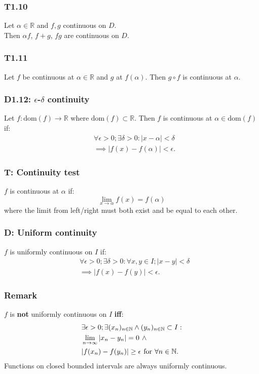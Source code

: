 \documentclass{article}
\begin{document}
\begin{multicols*}{3}
\subsubsection*{T1.10}
Let $\alpha\in\mathbb{R}$ and $f,g$ continuous on $D$. \\
Then $\alpha f$, $f+g$, $fg$ are continuous on $D$.

\subsubsection*{T1.11}
Let $f$ be continuous at $\alpha\in\mathbb{R}$
and $g$ at $f(\alpha)$.
Then $g\circ f$ is continuous at $\alpha$.

\subsubsection*{D1.12: $\epsilon$-$\delta$ continuity}
Let $f:\text{dom}(f)\rightarrow\mathbb{R}$
where $\text{dom}(f)\subset\mathbb{R}$.
Then $f$ is continuous at $\alpha\in\text{dom}(f)$ if:
\begin{align*}
    &\forall\epsilon>0;\exists\delta>0:
    |x-\alpha|<\delta \\
    &\implies
    |f(x)-f(\alpha)|<\epsilon.
\end{align*}

\subsubsection*{T: Continuity test}
$f$ is continuous at $\alpha$ if:
$$\lim_{x\rightarrow\alpha}f(x)=f(\alpha)$$
where the limit from left/right must both exist
and be equal to each other.

\subsubsection*{D: Uniform continuity}
$f$ is uniformly continuous on $I$ if:
\begin{align*}
    &\forall\epsilon>0;\exists\delta>0:
    \forall x,y\in I;
    |x-y|<\delta \\
    &\implies |f(x)-f(y)|<\epsilon.
\end{align*}

\subsubsection*{Remark}
$f$ is \textbf{not} uniformly continuous on $I$ \textbf{if{}f}:
\begin{align*}
    &\exists\epsilon>0;\exists (x_n)_{n\in\mathbb{N}}
    \wedge
    (y_n)_{n\in\mathbb{N}}\subset I: \\
    &\lim_{n\rightarrow\infty}|x_n-y_n|=0
    \hspace{0.05in}\wedge \\
    &|f(x_n)-f(y_n)|\geq\epsilon
    \hspace{0.05in}\text{for}\hspace{0.05in}
    \forall n\in\mathbb{N}.
\end{align*}
Functions on closed bounded intervals
are always uniformly continuous.


\end{multicols*}
\end{document}
